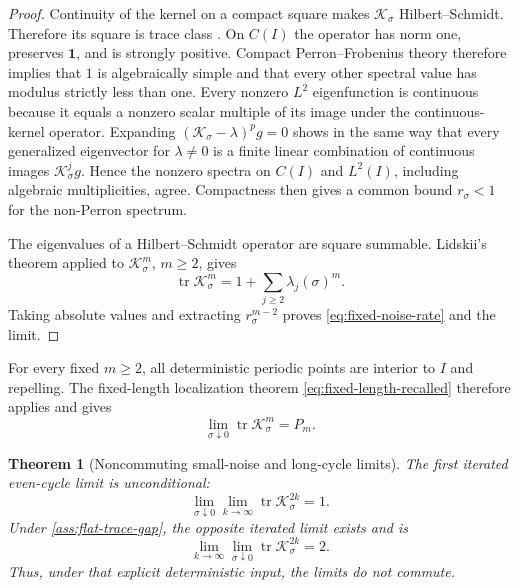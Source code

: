 \documentclass[11pt]{article}
\newtheorem{theorem}{Theorem}[section]
\theoremstyle{definition}
\theoremstyle{remark}
\newcommand{\cK}{\mathcal K}
\newcommand{\tr}{\operatorname{tr}}
\newcommand{\one}{\mathbf 1}
\begin{document}
\begin{proof}
Continuity of the kernel on a compact square makes $\cK_\sigma$
Hilbert--Schmidt.  Therefore its square is trace class
\citep{Kress2014,Simon2005}.  On $C(I)$ the operator has norm one, preserves
$\one$, and is strongly positive.  Compact Perron--Frobenius theory therefore
implies that $1$ is algebraically simple and that every other spectral value
has modulus strictly less than one.  Every nonzero $L^2$ eigenfunction is
continuous because it equals a nonzero scalar multiple of its image under the
continuous-kernel operator.  Expanding
$(\cK_\sigma-\lambda)^p g=0$ shows in the same way that every generalized
eigenvector for $\lambda\ne0$ is a finite linear combination of continuous
images $\cK_\sigma^jg$.  Hence the nonzero spectra on $C(I)$ and $L^2(I)$,
including algebraic multiplicities, agree.  Compactness then gives a common
bound $r_\sigma<1$ for the non-Perron spectrum.

The eigenvalues of a Hilbert--Schmidt operator are square summable.  Lidskii's
theorem applied to $\cK_\sigma^m$, $m\ge2$, gives
\begin{equation}\label{eq:lidskii}
 \tr\cK_\sigma^m
 =1+\sum_{j\ge2}\lambda_j(\sigma)^m.
\end{equation}
Taking absolute values and extracting $r_\sigma^{m-2}$ proves
\eqref{eq:fixed-noise-rate} and the limit.
\end{proof}

For every fixed $m\ge2$, all deterministic periodic points are interior to
$I$ and repelling.  The fixed-length localization theorem
\eqref{eq:fixed-length-recalled} therefore applies and gives
\begin{equation}\label{eq:fixed-m-zero-noise}
 \lim_{\sigma\downarrow0}\tr\cK_\sigma^m=P_m.
\end{equation}

\begin{theorem}[Noncommuting small-noise and long-cycle limits]
\label{thm:noncommuting}
The first iterated even-cycle limit is unconditional:
\begin{equation}\label{eq:first-iterated-limit}
 \lim_{\sigma\downarrow0}\lim_{k\to\infty}
 \tr\cK_\sigma^{2k}=1.
\end{equation}
Under \cref{ass:flat-trace-gap}, the opposite iterated limit exists and is
\begin{equation}\label{eq:second-iterated-limit}
 \lim_{k\to\infty}\lim_{\sigma\downarrow0}
 \tr\cK_\sigma^{2k}=2.
\end{equation}
Thus, under that explicit deterministic input, the limits do not commute.
\end{theorem}
\end{document}
